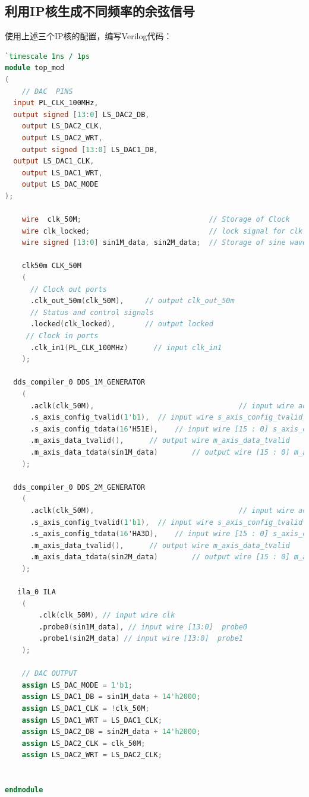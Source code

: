 \subsection{利用IP核生成不同频率的余弦信号}
使用上述三个IP核的配置，编写Verilog代码：
\begin{lstlisting}[language=verilog]
`timescale 1ns / 1ps
module top_mod
(
	// DAC  PINS
  input PL_CLK_100MHz, 
  output signed [13:0] LS_DAC2_DB,   
	output LS_DAC2_CLK,              
	output LS_DAC2_WRT,         
	output signed [13:0] LS_DAC1_DB, 
  output LS_DAC1_CLK, 
	output LS_DAC1_WRT,
	output LS_DAC_MODE
);

	wire  clk_50M;                              // Storage of Clock
	wire clk_locked;                            // lock signal for clk
	wire signed [13:0] sin1M_data, sin2M_data;  // Storage of sine waves
	
	clk50m CLK_50M
    (
      // Clock out ports
      .clk_out_50m(clk_50M),     // output clk_out_50m
      // Status and control signals
      .locked(clk_locked),       // output locked
     // Clock in ports
      .clk_in1(PL_CLK_100MHz)      // input clk_in1
    );
    
  dds_compiler_0 DDS_1M_GENERATOR 
    (
      .aclk(clk_50M),                                  // input wire aclk
      .s_axis_config_tvalid(1'b1),  // input wire s_axis_config_tvalid
      .s_axis_config_tdata(16'H51E),    // input wire [15 : 0] s_axis_config_tdata
      .m_axis_data_tvalid(),      // output wire m_axis_data_tvalid
      .m_axis_data_tdata(sin1M_data)        // output wire [15 : 0] m_axis_data_tdata
    );
    
  dds_compiler_0 DDS_2M_GENERATOR 
    (  
      .aclk(clk_50M),                                  // input wire aclk
      .s_axis_config_tvalid(1'b1),  // input wire s_axis_config_tvalid
      .s_axis_config_tdata(16'HA3D),    // input wire [15 : 0] s_axis_config_tdata
      .m_axis_data_tvalid(),      // output wire m_axis_data_tvalid
      .m_axis_data_tdata(sin2M_data)        // output wire [15 : 0] m_axis_data_tdata
    );

   ila_0 ILA 
    (
	    .clk(clk_50M), // input wire clk
	    .probe0(sin1M_data), // input wire [13:0]  probe0  
	    .probe1(sin2M_data) // input wire [13:0]  probe1
    );
		
	// DAC OUTPUT
	assign LS_DAC_MODE = 1'b1;
	assign LS_DAC1_DB = sin1M_data + 14'h2000;
	assign LS_DAC1_CLK = !clk_50M;
	assign LS_DAC1_WRT = LS_DAC1_CLK;
	assign LS_DAC2_DB = sin2M_data + 14'h2000;
	assign LS_DAC2_CLK = clk_50M;
	assign LS_DAC2_WRT = LS_DAC2_CLK;

	
endmodule
\end{lstlisting}

